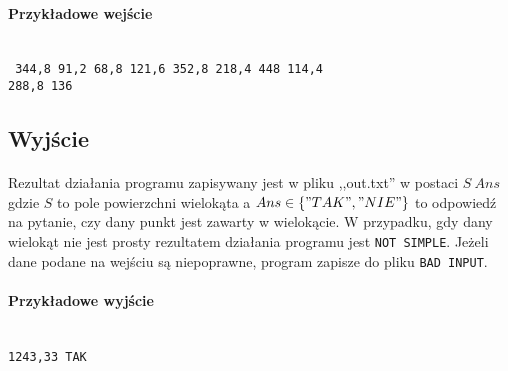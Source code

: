 \documentclass{article}
\begin{document}
\paragraph{Przykładowe wejście} \mbox{}\\
\texttt{
344,8 91,2 68,8 121,6 352,8 218,4 448 114,4\\
288,8 136
}

\subsection{Wyjście}
\paragraph{}Rezultat działania programu zapisywany jest w pliku ,,out.txt'' w postaci \(S\ Ans\) gdzie \(S\) to pole powierzchni wielokąta a \(Ans\in\{"TAK","NIE"\}\) to odpowiedź na pytanie, czy dany punkt jest zawarty w wielokącie. W przypadku, gdy dany wielokąt nie jest prosty rezultatem działania programu jest \texttt{NOT SIMPLE}. Jeżeli dane podane na wejściu są niepoprawne, program zapisze do pliku \texttt{BAD INPUT}.

\paragraph{Przykładowe wyjście} \mbox{}\\
\texttt{1243,33 TAK}
\end{document}
